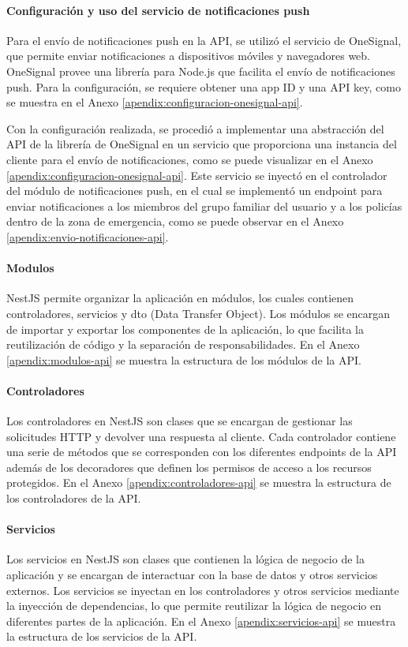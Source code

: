 \paragraph{Configuración y uso del servicio de notificaciones push}
Para el envío de notificaciones push en la API, se utilizó el servicio de OneSignal, que permite enviar notificaciones a dispositivos
móviles y navegadores web. OneSignal provee una librería para Node.js que facilita el envío de notificaciones push. Para la configuración,
se requiere obtener una app ID y una API key, como se muestra en el Anexo \ref{apendix:configuracion-onesignal-api}.
\bigbreak

Con la configuración realizada, se procedió a implementar una abstracción del API de la librería de OneSignal en un servicio que proporciona
una instancia del cliente para el envío de notificaciones, como se puede visualizar en el Anexo \ref{apendix:configuracion-onesignal-api}. Este servicio
se inyectó en el controlador del módulo de notificaciones push, en el cual se implementó un endpoint para enviar notificaciones a los miembros
del grupo familiar del usuario y a los policías dentro de la zona de emergencia, como se puede observar en el Anexo \ref{apendix:envio-notificaciones-api}.

\paragraph{Modulos}
NestJS permite organizar la aplicación en módulos, los cuales contienen controladores, servicios y dto (Data Transfer Object). Los módulos se encargan
de importar y exportar los componentes de la aplicación, lo que facilita la reutilización de código y la separación de responsabilidades. En el Anexo
\ref{apendix:modulos-api} se muestra la estructura de los módulos de la API.

\paragraph{Controladores}
Los controladores en NestJS son clases que se encargan de gestionar las solicitudes HTTP y devolver una respuesta al cliente. Cada controlador
contiene una serie de métodos que se corresponden con los diferentes endpoints de la API además de los decoradores que definen los permisos de
acceso a los recursos protegidos. En el Anexo \ref{apendix:controladores-api} se muestra la estructura de los controladores de la API.

\paragraph{Servicios}
Los servicios en NestJS son clases que contienen la lógica de negocio de la aplicación y se encargan de interactuar con la base de datos y otros
servicios externos. Los servicios se inyectan en los controladores y otros servicios mediante la inyección de dependencias, lo que permite reutilizar
la lógica de negocio en diferentes partes de la aplicación. En el Anexo \ref{apendix:servicios-api} se muestra la estructura de los servicios de la API.

